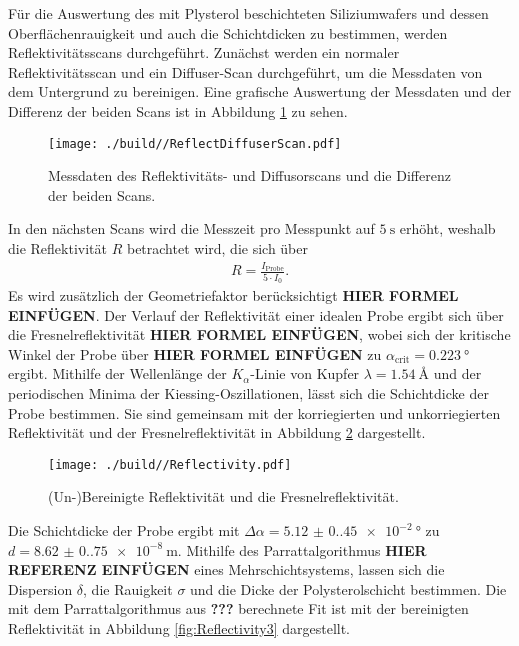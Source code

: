 Für die Auswertung des mit Plysterol beschichteten Siliziumwafers und dessen Oberflächenrauigkeit und auch die Schichtdicken zu bestimmen, werden Reflektivitätsscans durchgeführt.
Zunächst werden ein normaler Reflektivitätsscan und ein Diffuser-Scan durchgeführt, um die Messdaten von dem Untergrund zu bereinigen.
Eine grafische Auswertung der Messdaten und der Differenz der beiden Scans ist in Abbildung \ref{fig:Reflektivität} zu sehen.
\begin{figure}[H]
    \centering
    \texttt{[image: ./build//ReflectDiffuserScan.pdf]}
    \caption{Messdaten des Reflektivitäts- und Diffusorscans und die Differenz der beiden Scans.}
    \label{fig:Reflektivität}
\end{figure}
\noindent
In den nächsten Scans wird die Messzeit pro Messpunkt auf $\SI{5}{\second}$ erhöht, weshalb die Reflektivität $R$ betrachtet wird, die sich über
\begin{align*}
    R = \frac{I_{\text{Probe}}}{5\cdot I_{0}}.
\end{align*}
Es wird zusätzlich der Geometriefaktor berücksichtigt \textbf{HIER FORMEL EINFÜGEN}.
Der Verlauf der Reflektivität einer idealen Probe ergibt sich über die Fresnelreflektivität \textbf{HIER FORMEL EINFÜGEN}, wobei sich der kritische Winkel der Probe über \textbf{HIER FORMEL EINFÜGEN} zu $\alpha_{\text{crit}} = \SI{0.223}{\degree}$ ergibt.
Mithilfe der Wellenlänge der $K_{\alpha}$-Linie von Kupfer $\lambda = \SI{1.54}{\angstrom}$ und der periodischen Minima der Kiessing-Oszillationen, lässt sich die Schichtdicke der Probe bestimmen.
Sie sind gemeinsam mit der korriegierten und unkorriegierten Reflektivität und der Fresnelreflektivität in Abbildung \ref{fig:Reflektivität2} dargestellt.
\begin{figure}[H]
    \centering
    \texttt{[image: ./build//Reflectivity.pdf]}
    \caption{(Un-)Bereinigte Reflektivität und die Fresnelreflektivität.}
    \label{fig:Reflektivität2}
\end{figure}
\noindent
Die Schichtdicke der Probe ergibt mit $\Delta\alpha= \SI{5.12(0.45)e-2}{\degree}$ zu $d = \SI{8.62(0.75)e-8}{\meter}$. \newline
Mithilfe des Parrattalgorithmus \textbf{HIER REFERENZ EINFÜGEN} eines Mehrschichtsystems, lassen sich die Dispersion $\delta$, die Rauigkeit $\sigma$ und die Dicke der Polysterolschicht bestimmen.
Die mit dem Parrattalgorithmus aus \textbf{???} berechnete Fit ist mit der bereinigten Reflektivität in Abbildung \ref{fig:Reflectivity3} dargestellt.
